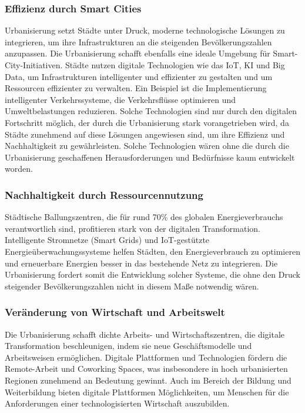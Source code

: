 \documentclass[conference,compsoc,final,a4paper, onecolumn, 11pt]{IEEEtran}
\begin{document}
\subsubsection{Effizienz durch Smart Cities}
Urbanisierung setzt Städte unter Druck, moderne technologische Lösungen zu integrieren, um ihre Infrastrukturen an die steigenden Bevölkerungszahlen anzupassen.
Die Urbanisierung schafft ebenfalls eine ideale Umgebung für Smart-City-Initiativen. 
Städte nutzen digitale Technologien wie das \ac{IoT}, \ac{KI} und Big Data, um Infrastrukturen intelligenter und effizienter zu gestalten und um Ressourcen effizienter zu verwalten.
Ein Beispiel ist die Implementierung intelligenter Verkehrssysteme, die Verkehrsflüsse optimieren und Umweltbelastungen reduzieren. 
Solche Technologien sind nur durch den digitalen Fortschritt möglich, der durch die Urbanisierung stark vorangetrieben wird, da Städte zunehmend auf diese Lösungen angewiesen sind, um ihre Effizienz und Nachhaltigkeit zu gewährleisten.
Solche Technologien wären ohne die durch die Urbanisierung geschaffenen Herausforderungen und Bedürfnisse kaum entwickelt worden. \autocite{mckinsey_smart_cities}


\subsubsection{ Nachhaltigkeit durch Ressourcennutzung}
Städtische Ballungszentren, die für rund 70\% des globalen Energieverbrauchs verantwortlich sind, profitieren stark von der digitalen Transformation. 
Intelligente Stromnetze (Smart Grids) und \ac{IoT}-gestützte Energieüberwachungssysteme helfen Städten, den Energieverbrauch zu optimieren und erneuerbare Energien besser in das bestehende Netz zu integrieren.
Die Urbanisierung fordert somit die Entwicklung solcher Systeme, die ohne den Druck steigender Bevölkerungszahlen nicht in diesem Maße notwendig wären.\autocite{mdpi_smart_cities_iot}
 

\subsubsection{	Veränderung von Wirtschaft und Arbeitswelt}
Die Urbanisierung schafft dichte Arbeits- und Wirtschaftszentren, die digitale Transformation beschleunigen, indem sie neue Geschäftsmodelle und Arbeitsweisen ermöglichen.
Digitale Plattformen und Technologien fördern die Remote-Arbeit und Coworking Spaces, was insbesondere in hoch urbanisierten Regionen zunehmend an Bedeutung gewinnt.
Auch im Bereich der Bildung und Weiterbildung bieten digitale Plattformen Möglichkeiten, um Menschen für die Anforderungen einer technologisierten Wirtschaft auszubilden. \autocite{xpert_digital_urbanization}
\end{document}
